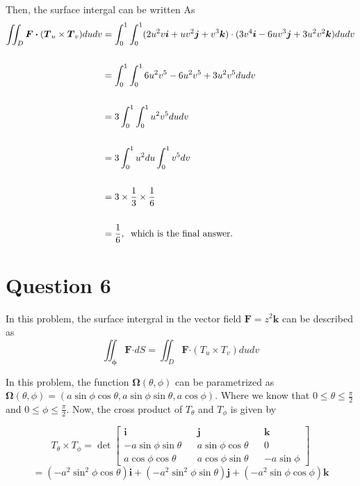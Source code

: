 \documentclass[12pt]{article}
\renewcommand{\vec}[1]{\boldsymbol{#1}}
\begin{document}
Then, the surface intergal can be written As
\begin{align*}
\iint_D \vec{F} \vec{\cdot} 
(\vec{T}_u \times \vec{T}_v) dudv &= \int_0^1 \int_0^1 
(2u^2v \vec i + uv^2 \vec j + v^3 \vec k) \cdot 
(3v^4 \vec i - 6uv^3 \vec j + 3u^2v^2 \vec k) dudv\\
&\\
&= \int_0^1 \int_0^1 6u^2v^5 - 6u^2v^5 + 3u^2v^5 dudv \\
&\\
&= 3\int_0^1 \int_0^1 u^2v^5 dudv\\
&\\
&= 3 \int_0^1 u^2 du \int_0^1 v^5 dv \\
&\\
&= 3 \times \frac{1}{3} \times \frac{1}{6}\\
&\\
&= \frac{1}{6}, \hspace*{0.2cm} \text{which is the final answer}.
\end{align*}

\newpage
\section*{Question 6}
In this problem, the surface intergral in the vector field
$\vec F = z^2 \vec k $ can be described as
\[ \iint_{\vec{\phi}} \vec{F} \vec{\cdot} dS 
= \iint_D \vec{F} \vec{\cdot} (T_u \times T_v) dudv \]

In this problem, the function $\vec{\Omega}(\theta,\phi)$ 
can  be parametrized as $\vec{\Omega}(\theta, \phi) = 
(a \sin{\phi}\cos{\theta} , a\sin{\phi}\sin{\theta} ,
a\cos{\phi})$. Where we know that
$ \displaystyle{0 \leq \theta \leq \frac{\pi}{2}
}$ and $\displaystyle{0 \leq \phi \leq 
\frac{\pi}{2}}$. Now, the cross product of $T_{\theta}$ and $T_{\phi}$ is
given by

\[ T_{\theta} \times T_{\phi} = \det
\begin{bmatrix}
\vec i & &\vec j & & \vec k \\
-a\sin{\phi}\sin{\theta} && a\sin{\phi}\cos{\theta}&&0\\
a\cos{\phi}\cos{\theta}&&a\cos{\phi}\sin{\theta}&&-a\sin{\phi}
\end{bmatrix}
\]
\[ = (-a^2\sin^2{\phi}\cos{\theta}) \vec i +
(-a^2\sin^2{\phi}\sin{\theta})\vec j + (-a^2\sin
{\phi}\cos{\phi})\vec k \]
\end{document}
